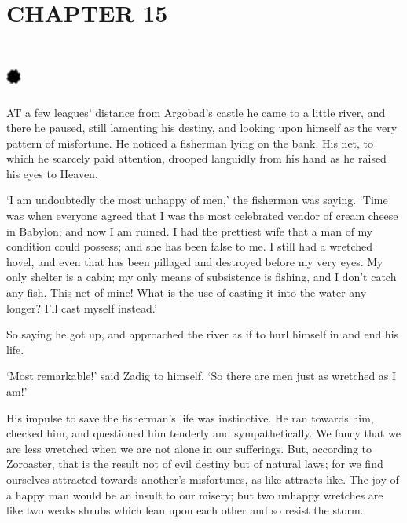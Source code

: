 \documentclass{article}
\begin{document}
\begin{center}
\section*{\textbf{CHAPTER 15 }}

\section*{%
\includegraphics[width=14pt, height=15pt, keepaspectratio=true]{Zadig or L'Ingenu - Voltaire-fig018.jpg}
}

 

AT a few leagues' distance from Argobad's castle he came to a little river, and 
there he paused, still lamenting his destiny, and looking upon himself as the very 
pattern of misfortune. He noticed a fisherman lying on the bank. His net, to which 
he scarcely paid attention, drooped languidly from his hand as he raised his eyes 
to Heaven. 

`I am undoubtedly the most unhappy of men,' the fisherman was saying. `Time was 
when everyone agreed that I was the most celebrated vendor of cream cheese in Babylon; 
and now I am ruined. I had the prettiest wife that a man of my condition could 
possess; and she has been false to me. I still had a wretched hovel, and even that 
has been pillaged and destroyed before my very eyes. My only shelter is a cabin; 
my only means of subsistence is fishing, and I don't catch any fish. This net of 
mine! What is the use of casting it into the water any longer? I'll cast myself 
instead.' 

So saying he got up, and approached the river as if to hurl himself in and end 
his life. 

`Most remarkable!' said Zadig to himself. `So there are men just as wretched as 
I am!' 

His impulse to save the fisherman's life was instinctive. He ran towards him, checked 
him, and questioned him tenderly and sympathetically. We fancy that we are less 
wretched when we are not alone in our sufferings. But, according to Zoroaster, 
that is the result not of evil destiny but of natural laws; for we find ourselves 
attracted towards another's misfortunes, as like attracts like. The joy of a happy 
man would be an insult to our misery; but two unhappy wretches are like two weaks 
shrubs which lean upon each other and so resist the storm. 


\end{center}
\end{document}
